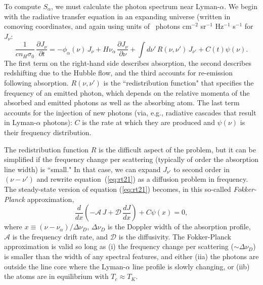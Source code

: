 \documentclass[a4paper,openany, 12pt]{book}
\begin{document}
To compute $S_\alpha$, we must calculate the photon spectrum near Lyman-$\alpha$.  We begin with the radiative
transfer equation in an expanding universe (written in comoving coordinates, and again using units of ~photons cm$^{-2}$ sr$^{-1}$ Hz$^{-1}$ s$^{-1}$ for $J_\nu$:
\begin{equation}
\frac{1}{c n_H \sigma_0} \, \frac{\partial J_\nu}{\partial t} = -\phi_\alpha(\nu) \, J_\nu + H \nu_\alpha \, \frac{\partial J_\nu}{\partial \nu} + \int d \nu' \, R(\nu,\nu') \, J_{\nu'} + C(t) \psi(\nu).
\label{eq:rt21}
\end{equation}
The first term on the right-hand side describes absorption, the second describes redshifting due to the Hubble flow, and the third accounts for re-emission following absorption.  $R(\nu,\nu')$ is the ``redistribution function" that specifies the frequency of an emitted photon, which depends on the relative momenta of the absorbed and
emitted photons as well as the absorbing atom. The last term accounts for the injection of new photons (via, e.g., radiative cascades that result in Lyman-$\alpha$ photons): $C$ is the rate at which they are produced and $\psi(\nu)$ is their frequency distribution.

The redistribution function $R$ is the difficult aspect of the problem, but it can be simplified if the frequency change per scattering (typically of order the absorption line width) is ``small."  In that case, we can expand $J_{\nu'}$ to second order in $(\nu-\nu')$ and rewrite equation~(\ref{eq:rt21}) as a diffusion problem in frequency.
The steady-state version of equation (\ref{eq:rt21}) becomes, in this so-called {\it Fokker-Planck} approximation, \cite{chen04}
\begin{equation}
\frac{d}{d x} \left( - {\mathcal A} \, J + {\mathcal D} \, \frac{d J}{d x} \right) + C \psi(x) = 0,
\label{eq:fokker}
\end{equation}
where $x \equiv (\nu-\nu_\alpha)/\Delta \nu_D$, $\Delta \nu_D$ is the Doppler width of the absorption profile, ${\mathcal A}$ is the frequency drift rate, and ${\mathcal D}$ is the diffusivity.  The Fokker-Planck approximation is valid so long as (i) the frequency change per scattering ($\sim \Delta \nu_D$) is smaller than the width of any spectral features, and either (iia) the photons are outside the line core where the Lyman-$\alpha$ line profile is slowly changing, or (iib) the atoms are in equilibrium with $T_c \approx T_K$.
\end{document}
